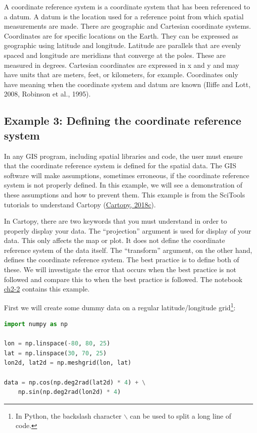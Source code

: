 \documentclass[a4paper , 12pt]{book}
\newcommand{\code}[1]{\colorbox{light-gray}{\texttt{#1}}}
\begin{document}
A coordinate reference system is a coordinate system that has been referenced to a datum. A datum is the location used for a reference point from which spatial measurements are made. There are geographic and Cartesian coordinate systems. Coordinates are for specific locations on the Earth. They can be expressed as geographic using latitude and longitude. Latitude are parallels that are evenly spaced and longitude are meridians that converge at the poles. These are measured in degrees. Cartesian coordinates are expressed in x and y and may have units that are meters, feet, or kilometers, for example. Coordinates only have meaning when the coordinate system and datum are known (Iliffe and Lott, 2008, Robinson et al., 1995). 

\subsection*{Example 3: Defining the coordinate reference system}

In any GIS program, including spatial libraries and code, the user must ensure that the coordinate reference system is defined for the spatial data. The GIS software will make assumptions, sometimes erroneous, if the coordinate reference system is not properly defined. In this example, we will see a demonstration of these assumptions and how to prevent them. This example is from the SciTools tutorials to understand Cartopy (\href{https://scitools.org.uk/cartopy/docs/latest/tutorials/understanding_transform.html}{Cartopy, 2018c}).

In Cartopy, there are two keywords that you must understand in order to properly display your data. The “projection” argument is used for display of your data. This only affects the map or plot. It does not define the coordinate reference system of the data itself. The “transform” argument, on the other hand, defines the coordinate reference system. The best practice is to define both of these. We will investigate the error that occurs when the best practice is not followed and compare this to when the best practice is followed. The notebook \href{https://github.com/nfcd/compGeo/blob/master/source/notebooks/ch2-2.ipynb}{ch2-2} contains this example.

First we will create some dummy data on a regular latitude/longitude grid\footnote{In Python, the backslash character \code{$\backslash$} can be used to split a long line of code.}:

\begin{center}
\begin{lstlisting}[language=Python, frame=single]
import numpy as np

lon = np.linspace(-80, 80, 25)
lat = np.linspace(30, 70, 25)
lon2d, lat2d = np.meshgrid(lon, lat)

data = np.cos(np.deg2rad(lat2d) * 4) + \
    np.sin(np.deg2rad(lon2d) * 4)
\end{lstlisting}
\end{center}
\end{document}
